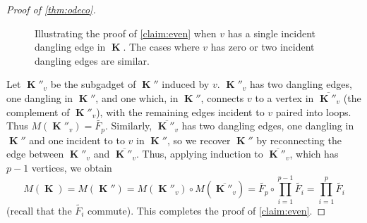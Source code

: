 \documentclass{article}
\theoremstyle{remark}
\theoremstyle{definition}
\DeclareMathOperator{\vk}{\mathbf{K}}
\begin{document}
\begin{proof}[Proof of \autoref{thm:odeco}]
\begin{figure}[ht!]
         \caption{Illustrating the proof of \autoref{claim:even} when $v$ has a single incident dangling
        edge in $\vk$. The cases where $v$ has zero or two incident dangling edges are similar.}
        \label{fig:symmetric_gadget}
    \end{figure}

    Let $\vk''_v$ be the subgadget of $\vk''$ induced by $v$. $\vk''_v$ has
    two dangling edges, one dangling in $\vk''$, and one which, in $\vk''$, connects $v$ to a 
    vertex in $\overline{\vk''_v}$ (the complement of $\vk''_v$), with the remaining edges incident
    to $v$ paired into loops. Thus $M(\vk''_v) = \widetilde{F_p}$. 
    Similarly, $\overline{\vk''_v}$ has two dangling edges, one dangling in $\vk''$ and one incident to
    to $v$ in $\vk''$, so we recover $\vk''$ by reconnecting the edge between $\vk''_v$ and 
    $\overline{\vk''_v}$. Thus, applying induction to $\overline{\vk''_v}$, which has $p-1$ vertices,
    we obtain
    \[
        M(\vk) = M(\vk'') = M(\vk''_v) \circ M(\overline{\vk''_v}) = \widetilde{F_p} \circ
        \prod_{i=1}^{p-1} \widetilde{F_i} = \prod_{i=1}^{p} \widetilde{F_i}
    \]
    (recall that the $\widetilde{F_i}$ commute). This completes the proof of \autoref{claim:even}.


\end{proof}
\end{document}
